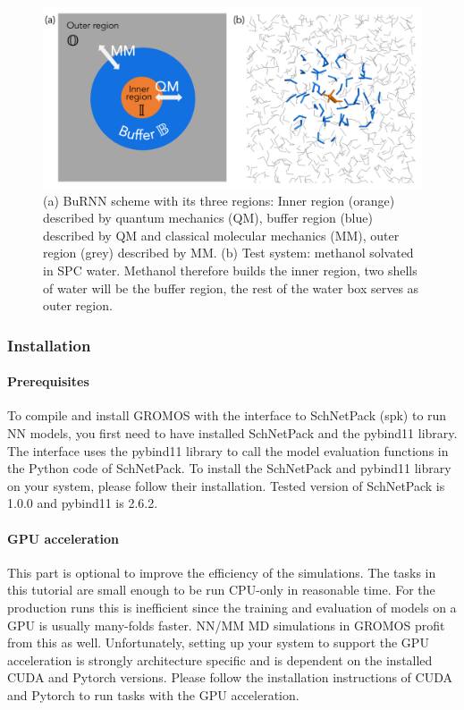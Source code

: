 \begin{figure}[H]
\centering
\includegraphics[scale=.33]{../09_tutorial_06/figures/BuRNN_scheme}
\caption{(a) BuRNN scheme with its three regions: Inner region (orange) described by quantum mechanics (QM), buffer region (blue) described by QM and classical molecular mechanics (MM), outer region (grey) described by MM. (b) Test system: methanol solvated in SPC water. Methanol therefore builds the inner region, two shells of water will be the buffer region, the rest of the water box serves as outer region.}
\label{BuRNN_scheme}
\end{figure}


\subsubsection{Installation}
\paragraph{Prerequisites}
To compile and install GROMOS with the interface to SchNetPack (spk) to run NN models, you first need to have installed SchNetPack and the pybind11 library. The interface uses the pybind11 library to call the model evaluation functions in the Python code of SchNetPack. To install the SchNetPack and pybind11 library on your system, please follow their installation. Tested version of SchNetPack is 1.0.0 and pybind11 is 2.6.2.

\paragraph{GPU acceleration}
This part is optional to improve the efficiency of the simulations. The tasks in this tutorial are small enough to be run CPU-only in reasonable time. For the production runs this is inefficient since the training and evaluation of models on a GPU is usually many-folds faster. NN/MM MD simulations in GROMOS profit from this as well. Unfortunately, setting up your system to support the GPU acceleration is strongly architecture specific and is dependent on the installed CUDA and Pytorch versions. Please follow the installation instructions of CUDA and Pytorch to run tasks with the GPU acceleration.

